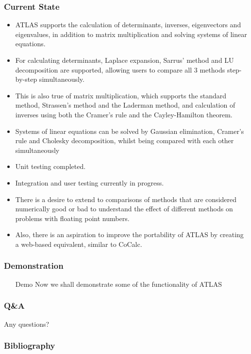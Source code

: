 \begin{frame}[allowframebreaks]
\frametitle{Current State}\pause
\begin{itemize}[<+->]
\item ATLAS supports the calculation of determinants, inverses, eigenvectors and eigenvalues, in addition to matrix multiplication and solving systems of linear equations.
\item For calculating determinants, Laplace expansion, Sarrus' method and LU decomposition are supported, allowing users to compare all 3 methods step-by-step simultaneously.
\item This is also true of matrix multiplication, which supports the standard method, Strassen's method and the Laderman method, and calculation of inverses using both the Cramer's rule and the Cayley-Hamilton theorem.
\item Systems of linear equations can be solved by Gaussian elimination, Cramer's rule and Cholesky decomposition, whilst being compared with each other simultaneously
\item Unit testing completed.
\item Integration and user testing currently in progress.
\item There is a desire to extend to comparisons of methods that are considered numerically good or bad to understand the effect of different methods on problems with floating point numbers.
\item Also, there is an aspiration to improve the portability of ATLAS by creating a web-based equivalent, similar to CoCalc.
\end{itemize}
\end{frame}

\begin{frame}
\frametitle{Demonstration}\pause
\begin{itemize}[<+->]
\item[Demo] Now we shall demonstrate some of the functionality of ATLAS
\end{itemize}
\end{frame}

\begin{frame}
\frametitle{Q\&A}\pause
\begin{description}[<+->]
Any questions?
\end{description}
\end{frame}

\begin{frame}[allowframebreaks]
\frametitle{Bibliography}

\end{frame}




